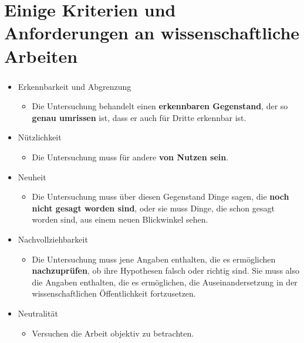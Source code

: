 \documentclass[aspectratio=169]{beamer}
\begin{document}
\section{Einige Kriterien und Anforderungen an wissenschaftliche Arbeiten}
\begin{frame}
  \frametitle{\insertsection}%
  \framesubtitle{\insertsubsection}%
  \begin{itemize}
   \item Erkennbarkeit und Abgrenzung
   \begin{itemize}
    \item Die Untersuchung behandelt einen \textbf{erkennbaren Gegenstand}, der so \textbf{genau umrissen} ist, dass er auch für Dritte erkennbar ist.
   \end{itemize}
   \item Nützlichkeit
   \begin{itemize}
    \item Die Untersuchung muss für andere \textbf{von Nutzen sein}.
   \end{itemize}
   \item Neuheit
   \begin{itemize}
    \item Die Untersuchung muss über diesen Gegenstand Dinge sagen, die \textbf{noch nicht gesagt worden sind}, oder sie muss Dinge, die schon gesagt worden sind, aus einem neuen Blickwinkel sehen.
   \end{itemize}
   \item Nachvollziehbarkeit
   \begin{itemize}
    \item Die Untersuchung muss jene Angaben enthalten, die es ermöglichen \textbf{nachzuprüfen}, ob ihre Hypothesen falsch oder richtig sind. Sie muss also die Angaben enthalten, die es ermöglichen, die Auseinandersetzung in der wissenschaftlichen Öffentlichkeit fortzusetzen.
   \end{itemize}
   \item Neutralität
   \begin{itemize}
    \item Versuchen die Arbeit objektiv zu betrachten.
   \end{itemize}
  \end{itemize}
\end{frame}
\end{document}
